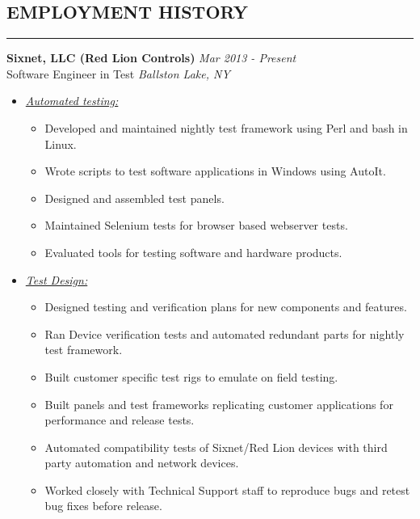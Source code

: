 \documentclass{article}
\begin{document}
\subsection*{\MakeUppercase{\bf Employment History}}
    \hrule
    \bigskip
    {\bf Sixnet, LLC (Red Lion Controls)} \hfill {\em Mar 2013 - Present} \\
    Software Engineer in Test \hfill {\em Ballston Lake, NY} \\
    \begin{itemize}
    \item \underline{\it Automated testing:}
          \begin{itemize}
          \item Developed and maintained nightly test framework using Perl
                and bash in Linux.
          \item Wrote scripts to test software applications in Windows using
                AutoIt.
          \item Designed and assembled test panels.
          \item Maintained Selenium tests for browser based webserver tests.
          \item Evaluated tools for testing software and hardware products.
          \end{itemize}
    \item \underline{\it Test Design:}
          \begin{itemize}
          \item Designed testing and verification plans for new components
                and features.
          \item Ran Device verification tests and automated redundant parts
                for nightly test framework.
          \item Built customer specific test rigs to emulate on field testing.
          \item Built panels and test frameworks replicating customer
                applications for performance and release tests.
          \item Automated compatibility tests of Sixnet/Red Lion devices with
                third party automation and network devices.
          \item Worked closely with Technical Support staff to reproduce bugs
                and retest bug fixes before release.
          \end{itemize}
    \end{itemize}
    \bigskip
\end{document}
